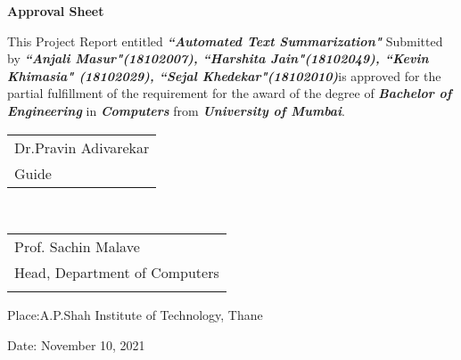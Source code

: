 \newpage
\thispagestyle{empty}
\vspace*{0.2cm}
\vspace{1cm}
\begin{center}
 \large\textbf{Approval Sheet}
\end{center}
\vspace{1cm}

\par This Project Report entitled \textbf{\textit{``Automated Text Summarization"}} Submitted by
\textbf{\textit{``Anjali Masur"(18102007), ``Harshita Jain"(18102049), ``Kevin Khimasia" (18102029), ``Sejal Khedekar"(18102010)}}is approved for the partial fulfillment of the requirement for the award of the degree of \textbf{\textit{Bachelor of Engineering} }in\textbf{ \textit{Computers}} from \textbf{\textit{University of Mumbai}}.


\vspace{40mm}
\begin{tabular}{@{}l@{}}
\hspace{115mm}       Dr.Pravin Adivarekar\\
\hspace{130mm}    Guide\\

\end{tabular}
\vspace{40mm}\\
\hfill
\begin{tabular}{@{}l@{}}
\hspace{123mm} Prof. Sachin Malave\\
\hspace{103mm}Head, Department of Computers \\

\vspace{5mm}
\end{tabular}

\vspace{40mm}
Place:A.P.Shah Institute of Technology, Thane\par
\vspace{1mm}
Date: November 10, 2021
\clearpage